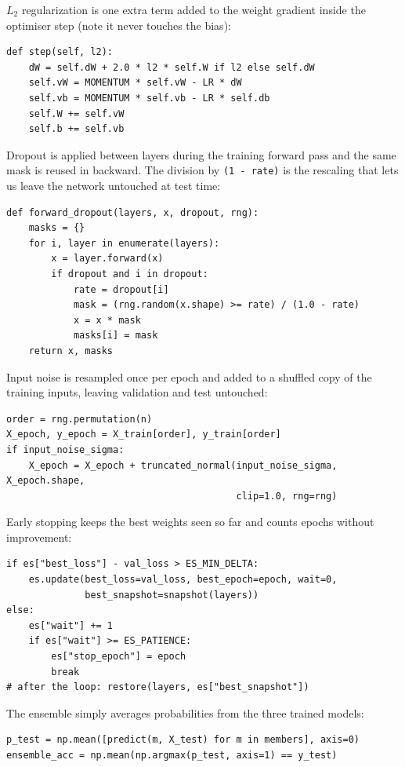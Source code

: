 \documentclass[12pt]{article}
\begin{document}
$L_2$ regularization is one extra term added to the weight gradient inside the
optimiser step (note it never touches the bias):

\begin{lstlisting}
def step(self, l2):
    dW = self.dW + 2.0 * l2 * self.W if l2 else self.dW
    self.vW = MOMENTUM * self.vW - LR * dW
    self.vb = MOMENTUM * self.vb - LR * self.db
    self.W += self.vW
    self.b += self.vb
\end{lstlisting}

Dropout is applied between layers during the training forward pass and the same
mask is reused in backward. The division by \texttt{(1 - rate)} is the
rescaling that lets us leave the network untouched at test time:

\begin{lstlisting}
def forward_dropout(layers, x, dropout, rng):
    masks = {}
    for i, layer in enumerate(layers):
        x = layer.forward(x)
        if dropout and i in dropout:
            rate = dropout[i]
            mask = (rng.random(x.shape) >= rate) / (1.0 - rate)
            x = x * mask
            masks[i] = mask
    return x, masks
\end{lstlisting}

Input noise is resampled once per epoch and added to a shuffled copy of the
training inputs, leaving validation and test untouched:

\begin{lstlisting}
order = rng.permutation(n)
X_epoch, y_epoch = X_train[order], y_train[order]
if input_noise_sigma:
    X_epoch = X_epoch + truncated_normal(input_noise_sigma, X_epoch.shape,
                                         clip=1.0, rng=rng)
\end{lstlisting}

Early stopping keeps the best weights seen so far and counts epochs without
improvement:

\begin{lstlisting}
if es["best_loss"] - val_loss > ES_MIN_DELTA:
    es.update(best_loss=val_loss, best_epoch=epoch, wait=0,
              best_snapshot=snapshot(layers))
else:
    es["wait"] += 1
    if es["wait"] >= ES_PATIENCE:
        es["stop_epoch"] = epoch
        break
# after the loop: restore(layers, es["best_snapshot"])
\end{lstlisting}

The ensemble simply averages probabilities from the three trained models:

\begin{lstlisting}
p_test = np.mean([predict(m, X_test) for m in members], axis=0)
ensemble_acc = np.mean(np.argmax(p_test, axis=1) == y_test)
\end{lstlisting}
\end{document}
